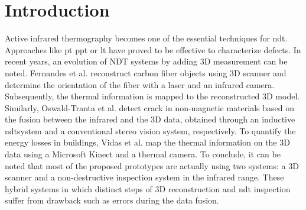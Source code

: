 \graphicspath{ {./content/intro/figure/} }

\section{Introduction}

Active infrared thermography becomes one of the essential techniques for \ac{ndt}. Approaches like \ac{pt}\cite{Maldague2002} \ac{ppt} \cite{Maldague1996} or \ac{lt} \cite{Wu1998} have proved to be effective to characterize defects. 
In recent years, an evolution of NDT systems by adding 3D measurement can be noted. Fernandes et al.\cite{fernandes2015fiber} reconstruct carbon fiber objects using 3D scanner and determine the orientation of the fiber with a laser and an infrared camera. Subsequently, the thermal information is mapped to the reconstructed 3D model. Similarly, Oswald-Tranta et al.\cite{Oswald-Tranta2012} detect crack in non-magnetic materials based on the fusion between the infrared and the 3D data, obtained through an inductive \ac{ndt}system and a conventional stereo vision system, respectively.
To quantify the energy losses in buildings, Vidas et al.\cite{Vidas2013} map the thermal information on the 3D data using a Microsoft Kinect and a thermal camera. To conclude, it can be noted that most of the proposed prototypes are actually using two systems: a 3D scanner and a non-destructive inspection system in the infrared range. These hybrid systems in which distinct steps of 3D reconstruction and \ac{ndt} inspection suffer from drawback such as errors during the data fusion.

